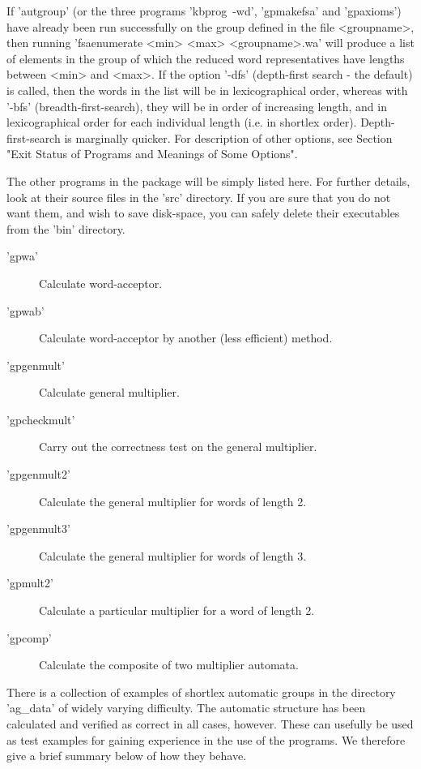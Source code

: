 If 'autgroup' (or the three programs 'kbprog\ -wd', 'gpmakefsa'
and 'gpaxioms') have already been run successfully on the group defined
in the file <groupname>,
then running 'fsaenumerate <min> <max> <groupname>.wa'
will produce a list of elements in the group of which the reduced
word representatives have lengths between <min> and <max>.
If the option '-dfs' (depth-first search - the default) is called,
then the words
in the list will be in lexicographical order, whereas with '-bfs'
(breadth-first-search), they will be in order of increasing length, and in
lexicographical order for each individual length (i.e. in shortlex order).
Depth-first-search is marginally quicker.
For description of other options, see Section
"Exit Status of Programs and Meanings of Some Options".


The other programs in the package will be simply listed here. For
further details, look at their source files in the 'src' directory.
If you are sure that you do not want them, and wish to save disk-space,
you can safely delete their executables from the 'bin' directory.
\begin{description}
\item['gpwa'] Calculate word-acceptor.
\item['gpwab'] Calculate word-acceptor by another (less efficient) method.
\item['gpgenmult'] Calculate general multiplier.
\item['gpcheckmult'] Carry out the correctness test on the general multiplier.
\item['gpgenmult2'] Calculate the general multiplier for words of length 2.
\item['gpgenmult3'] Calculate the general multiplier for words of length 3.
\item['gpmult2'] Calculate a particular multiplier for a word of length 2.
\item['gpcomp'] Calculate the composite of two multiplier automata.
\end{description}


There is a collection of examples of shortlex automatic groups in the
directory 'ag\_data' of widely varying difficulty. The automatic structure
has been calculated and verified as correct in all cases, however.
These can usefully be used as test examples for gaining experience in the
use of the programs. We therefore give a brief summary below of how
they behave.

